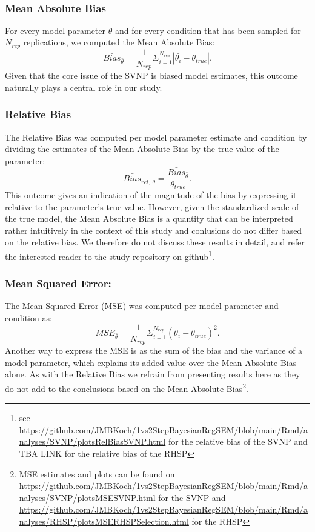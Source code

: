 \documentclass[
  man, donotrepeattitle,floatsintext]{apa6}
\begin{document}
~

\hypertarget{mean-absolute-bias}{%
\subsubsection{Mean Absolute Bias}\label{mean-absolute-bias}}

For every model parameter \(\theta\) and for every condition that has been sampled for \(N_{rep}\) replications, we computed the Mean Absolute Bias:
\[\bar{Bias}_{\bar{\theta}} = \frac{1}{N_{rep}} \Sigma_{i = 1}^{N_{rep}} |\bar{\theta_i} - \theta_{true}|.\]
Given that the core issue of the SVNP is biased model estimates, this outcome naturally plays a central role in our study.

\hypertarget{relative-bias}{%
\subsubsection{Relative Bias}\label{relative-bias}}

The Relative Bias was computed per model parameter estimate and condition by dividing the estimates of the Mean Absolute Bias by the true value of the parameter:
\[\bar{Bias}_{rel, \ \bar{\theta} } = \frac{\bar{Bias}_{\bar{\theta}}}{\theta_{true} }.\]
This outcome gives an indication of the magnitude of the bias by expressing it relative to the parameter's true value. However, given the standardized scale of the true model, the Mean Absolute Bias is a quantity that can be interpreted rather intuitively in the context of this study and conlusions do not differ based on the relative bias. We therefore do not discuss these results in detail, and refer the interested reader to the study repository on github\footnote{see \url{https://github.com/JMBKoch/1vs2StepBayesianRegSEM/blob/main/Rmd/analyses/SVNP/plotsRelBiasSVNP.html} for the relative bias of the SVNP and TBA LINK for the relative bias of the RHSP}.

\hypertarget{mean-squared-error}{%
\subsubsection{Mean Squared Error:}\label{mean-squared-error}}

The Mean Squared Error (MSE) was computed per model parameter and condition as:
\[MSE_{\bar{\theta}} = \frac{1}{N_{rep}} \Sigma_{i = 1}^{N_{rep}} (\bar{\theta_i} - \theta_{true})^2.\]
Another way to express the MSE is as the sum of the bias and the variance of a model parameter, which explains its added value over the Mean Absolute Bias alone. As with the Relative Bias we refrain from presenting results here as they do not add to the conclusions based on the Mean Absolute Bias\footnote{MSE estimates and plots can be found on \url{https://github.com/JMBKoch/1vs2StepBayesianRegSEM/blob/main/Rmd/analyses/SVNP/plotsMSESVNP.html} for the SVNP and \url{https://github.com/JMBKoch/1vs2StepBayesianRegSEM/blob/main/Rmd/analyses/RHSP/plotsMSERHSPSelection.html} for the RHSP}.
\end{document}
